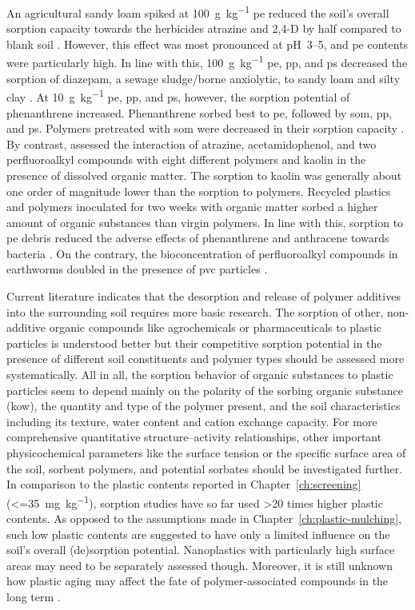 An agricultural sandy loam spiked at \SI{100}{\gram\per\kilo\gram} \ac{pe} reduced the soil's overall sorption capacity towards the herbicides atrazine and 2,4-D by half compared to blank soil \citep{HufferPolyethylene2019}. However, this effect was most pronounced at pH~\numrange{3}{5}, and \ac{pe} contents were particularly high. In line with this, \SI{100}{\gram\per\kilo\gram} \ac{pe}, \ac{pp}, and \ac{ps} decreased the sorption of diazepam, a sewage sludge\-/borne anxiolytic, to sandy loam and silty clay \citep{XuContrasting2021}. At \SI{10}{\gram\per\kilo\gram} \ac{pe}, \ac{pp}, and \ac{ps}, however, the sorption potential of phenanthrene increased. Phenanthrene sorbed best to \ac{pe}, followed by \ac{som}, \ac{pp}, and \ac{ps}. Polymers pretreated with \ac{som} were decreased in their sorption capacity \citep{XuContrasting2021}.
By contrast, \citet{AteiaSorption2020} assessed the interaction of atrazine, acetamidophenol, and two perfluoroalkyl compounds with eight different polymers and kaolin in the presence of dissolved organic matter. The sorption to kaolin was generally about one order of magnitude lower than the sorption to polymers. Recycled plastics and polymers inoculated for two weeks with organic matter sorbed a higher amount of organic substances than virgin polymers.
In line with this, sorption to \ac{pe} debris reduced the adverse effects of phenanthrene and anthracene towards bacteria \citep{KleinteichMicroplastics2018}. On the contrary, the bioconcentration of perfluoroalkyl compounds in earthworms doubled in the presence of \ac{pvc} particles \citep{SobhaniMicroplastics2021}.

Current literature indicates that the desorption and release of polymer additives into the surrounding soil requires more basic research. The sorption of other, non-additive organic compounds like agrochemicals or pharmaceuticals to plastic particles is understood better but their competitive sorption potential in the presence of different soil constituents and polymer types should be assessed more systematically. All in all, the sorption behavior of organic substances to plastic particles seem to depend mainly on the polarity of the sorbing organic substance (\ac{kow}), the quantity and type of the polymer present, and the soil characteristics including its texture, water content and cation exchange capacity. For more comprehensive quantitative structure--activity relationships, other important physicochemical parameters like the surface tension or the specific surface area of the soil, sorbent polymers, and potential sorbates should be investigated further.
In comparison to the plastic contents reported in Chapter~\ref{ch:screening} (\SI{<=35}{\milli\gram\per\kilo\gram}), sorption studies have so far used \num{>20} times higher plastic contents. As opposed to the assumptions made in Chapter~\ref{ch:plastic-mulching}, such low plastic contents are suggested to have only a limited influence on the soil's overall (de)sorption potential. Nanoplastics with particularly high surface areas may need to be separately assessed though. Moreover, it is still unknown how plastic aging may affect the fate of polymer-associated compounds in the long term \citep{ZhaAging2021}.

